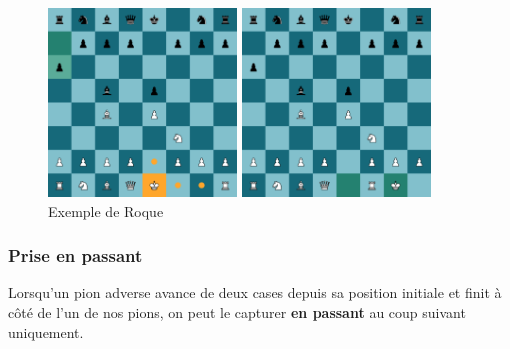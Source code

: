 \documentclass{article}
\begin{document}
\begin{figure}[h]
    \centering
    \begin{minipage}[b]{0.45\textwidth}
        \centering
        \includegraphics[width=\textwidth,height=5cm,keepaspectratio]{roque1.png}
    \end{minipage}
    \hspace{0.005\textwidth}
    \begin{minipage}[b]{0.45\textwidth}
        \centering
        \includegraphics[width=\textwidth,height=5cm,keepaspectratio]{roque2.png}
    \end{minipage}
    \caption{Exemple de Roque}
\end{figure}

\subsubsection*{Prise en passant}
Lorsqu'un pion adverse avance de deux cases depuis sa position initiale et finit à côté de l’un de nos pions, on peut le capturer \textbf{en passant} au coup suivant uniquement.
\end{document}
